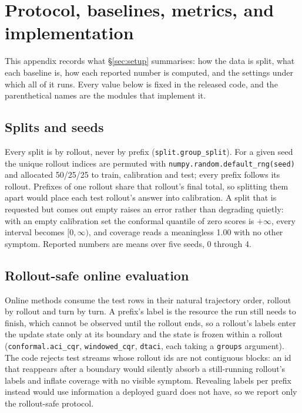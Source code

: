 \documentclass{article}
\begin{document}
\section{Protocol, baselines, metrics, and implementation}
\label{app:protocol}

This appendix records what \S\ref{sec:setup} summarises: how the data is split, what
each baseline is, how each reported number is computed, and the settings under which
all of it runs. Every value below is fixed in the released code, and the parenthetical
names are the modules that implement it.

\subsection{Splits and seeds}

Every split is by rollout, never by prefix (\texttt{split.group\_split}). For a given
seed the unique rollout indices are permuted with
\texttt{numpy.random.default\_rng(seed)} and allocated 50/25/25 to train, calibration
and test; every prefix follows its rollout. Prefixes of one rollout share that
rollout's final total, so splitting them apart would place each test rollout's answer
into calibration. A split that is requested but comes out empty raises an error rather
than degrading quietly: with an empty calibration set the conformal quantile of zero
scores is $+\infty$, every interval becomes $[0, \infty)$, and coverage reads a
meaningless 1.00 with no other symptom. Reported numbers are means over five seeds,
0 through 4.

\subsection{Rollout-safe online evaluation}

Online methods consume the test rows in their natural trajectory order, rollout by
rollout and turn by turn. A prefix's label is the resource the run still needs to
finish, which cannot be observed until the rollout ends, so a rollout's labels enter
the update state only at its boundary and the state is frozen within a rollout
(\texttt{conformal.aci\_cqr}, \texttt{windowed\_cqr}, \texttt{dtaci}, each taking a
\texttt{groups} argument). The code rejects test streams whose rollout ids are not
contiguous blocks: an id that reappears after a boundary would silently absorb a
still-running rollout's labels and inflate coverage with no visible symptom. Revealing
labels per prefix instead would use information a deployed guard does not have, so we
report only the rollout-safe protocol.
\end{document}
